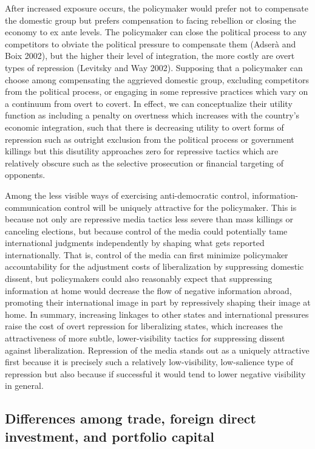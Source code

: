 \documentclass[a4paper]{article}\usepackage[]{graphicx}\usepackage[]{color}
\begin{document}
After increased exposure occurs, the policymaker would prefer not to compensate the domestic group but prefers compensation to facing rebellion or closing the economy to ex ante levels. The policymaker can close the political process to any competitors to obviate the political pressure to compensate them (Adserà and Boix 2002), but the higher their level of integration, the more costly are overt types of repression (Levitsky and Way 2002). Supposing that a policymaker can choose among compensating the aggrieved domestic group, excluding competitors from the political process, or engaging in some repressive practices which vary on a continuum from overt to covert. In effect, we can conceptualize their utility function as including a penalty on overtness which increases with the country's economic integration, such that there is decreasing utility to overt forms of repression such as outright exclusion from the political process or government killings but this disutility approaches zero for repressive tactics which are relatively obscure such as the selective prosecution or financial targeting of opponents.

Among the less visible ways of exercising anti-democratic control, information-communication control will be uniquely attractive for the policymaker. This is because not only are repressive media tactics less severe than mass killings or canceling elections, but because control of the media could potentially tame international judgments independently by shaping what gets reported internationally. That is, control of the media can first minimize policymaker accountability for the adjustment costs of liberalization by suppressing domestic dissent, but policymakers could also reasonably expect that suppressing information at home would decrease the flow of negative information abroad, promoting their international image in part by repressively shaping their image at home. In summary, increasing linkages to other states and international pressures raise the cost of overt repression for liberalizing states, which increases the attractiveness of more subtle, lower-visibility tactics for suppressing dissent against liberalization. Repression of the media stands out as a uniquely attractive first because it is precisely such a relatively low-visibility, low-salience type of repression but also because if successful it would tend to lower negative visibility in general.

\subsection{Differences among trade, foreign direct investment, and portfolio capital}
\end{document}
